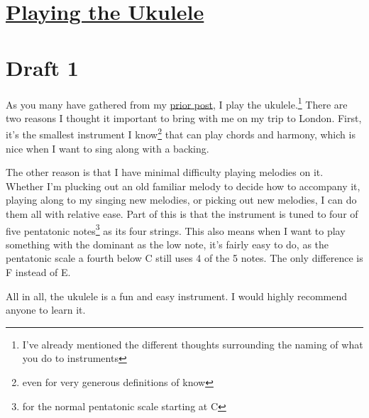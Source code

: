 \documentclass[12pt]{article}[titlepage]
\newcommand{\1}{\={a}}
\newcommand{\2}{\={e}}
\newcommand{\3}{\={\i}}
\newcommand{\4}{\=o}
\newcommand{\5}{\=u}
\newcommand{\6}{\={A}}
\renewcommand{\,}{\textsuperscript{,}}
\begin{document}
\doublespacing
\section{\href{playing-the-ukulele.html}{Playing the Ukulele}}
\section{Draft 1}
As you many have gathered from my \href{j.rebelsky.com/pierogi-recipe.html}{prior post}, I play the ukulele.\footnote{I’ve already mentioned the different thoughts surrounding the naming of what you do to instruments}
There are two reasons I thought it important to bring with me on my trip to London.
First, it’s the smallest instrument I know\footnote{even for very generous definitions of know} that can play chords and harmony, which is nice when I want to sing along with a backing.

The other reason is that I have minimal difficulty playing melodies on it.
Whether I’m plucking out an old familiar melody to decide how to accompany it, playing along to my singing new melodies, or picking out new melodies, I can do them all with relative ease.
Part of this is that the instrument is tuned to four of five pentatonic notes\footnote{for the normal pentatonic scale starting at C} as its four strings.
This also means when I want to play something with the dominant as the low note, it’s fairly easy to do, as the pentatonic scale a fourth below C still uses 4 of the 5 notes.
The only difference is F instead of E.

All in all, the ukulele is a fun and easy instrument.
I would highly recommend anyone to learn it.
\end{document}
